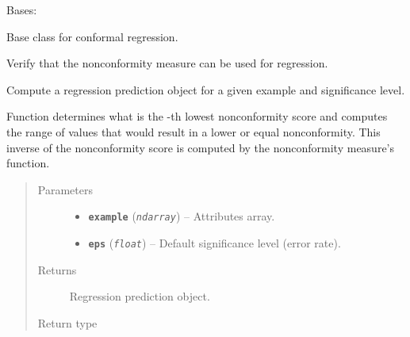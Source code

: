 \documentclass[letterpaper,10pt,english]{sphinxmanual}
\begin{document}
\begin{fulllineitems}
\label{cp.regression:cp.regression.ConformalRegressor}
Bases: {\hyperref[cp.base:cp.base.ConformalPredictor]{}}

Base class for conformal regression.

\begin{fulllineitems}
\label{cp.regression:cp.regression.ConformalRegressor.__init__}
Verify that the nonconformity measure can be used for regression.

\end{fulllineitems}


\begin{fulllineitems}
\label{cp.regression:cp.regression.ConformalRegressor.predict}
Compute a regression prediction object for a given example and significance level.

Function determines what is the -th lowest nonconformity score and computes
the range of values that would result in a lower or equal nonconformity. This inverse
of the nonconformity score is computed by the nonconformity measure's
{\hyperref[cp.nonconformity:cp.nonconformity.RegrNC.predict]{}} function.
\begin{quote}\begin{description}
\item[{Parameters}] \leavevmode\begin{itemize}
\item {} 
\textbf{\texttt{example}} (\emph{\texttt{ndarray}}) -- Attributes array.

\item {} 
\textbf{\texttt{eps}} (\emph{\texttt{float}}) -- Default significance level (error rate).

\end{itemize}

\item[{Returns}] \leavevmode
Regression prediction object.

\item[{Return type}] \leavevmode
{\hyperref[cp.regression:cp.regression.PredictionRegr]{}}


\end{description}
\end{quote}
\end{fulllineitems}
\end{fulllineitems}
\end{document}
